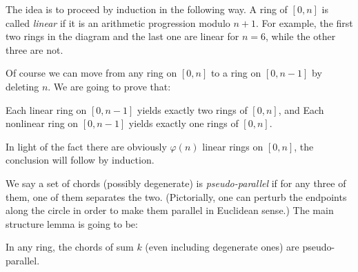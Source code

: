 The idea is to proceed by induction in the following way.
A ring of $[0,n]$ is called \emph{linear}
if it is an arithmetic progression modulo $n+1$.
For example, the first two rings in the diagram
and the last one are linear for $n = 6$,
while the other three are not.

Of course we can move from any ring on $[0,n]$
to a ring on $[0,n-1]$ by deleting $n$.
We are going to prove that:
\begin{itemize}
  \ii Each linear ring on $[0,n-1]$ yields exactly two
  rings of $[0,n]$, and
  \ii Each nonlinear ring on $[0,n-1]$ yields exactly one
  rings of $[0,n]$.
\end{itemize}
In light of the fact there are obviously $\varphi(n)$ linear rings on $[0,n]$,
the conclusion will follow by induction.

We say a set of chords (possibly degenerate) is \emph{pseudo-parallel}
if for any three of them, one of them separates the two.
(Pictorially, one can perturb the endpoints along the circle
in order to make them parallel in Euclidean sense.)
The main structure lemma is going to be:
\begin{lemma*}
  In any ring, the chords of sum $k$
  (even including degenerate ones) are pseudo-parallel.
\end{lemma*}
